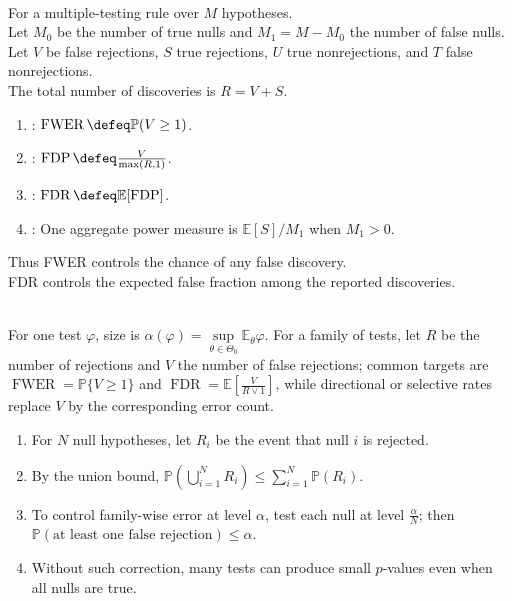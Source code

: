 \begin{definition} \label{def:false-discovery-rate} \\
For a multiple-testing rule over $M$ hypotheses.\\
Let $M_0$ be the number of true nulls and $M_1=M-M_0$ the number of false nulls.\\
Let $V$ be false rejections, $S$ true rejections, $U$ true nonrejections, and $T$ false nonrejections.\\
The total number of discoveries is $R=V+S$.
\begin{enumerate}[label=(\roman*)]
\setlength{\itemsep}{0pt}
\item {}: $\operatorname{FWER}\defeq\mathbb{P}(V\geq1)$.
\item {}: $\operatorname{FDP}\defeq\frac{V}{\max(R,1)}$.
\item {}: $\operatorname{FDR}\defeq\mathbb{E}[\operatorname{FDP}]$.
\item {}: One aggregate power measure is $\mathbb{E}[S]/M_1$ when $M_1>0$.
\end{enumerate}
Thus FWER controls the chance of any false discovery.\\
FDR controls the expected false fraction among the reported discoveries.
\end{definition}

\begin{remark} \label{rem:error-control-families} \\
For one test $\varphi$, size is $\alpha(\varphi)=\sup\limits_{\theta\in\Theta_0}\mathbb{E}_\theta\varphi$.
For a family of tests, let $R$ be the number of rejections and $V$ the number of false rejections; common targets are $\operatorname{FWER}=\mathbb{P}\{V\geq1\}$ and $\operatorname{FDR}=\mathbb{E}[\frac{V}{R\vee1}]$, while directional or selective rates replace $V$ by the corresponding error count.
\end{remark}

\begin{method} \label{prin:fishing-expeditions-and-bonferroni} 
\begin{enumerate}[label=(\roman*)]
\setlength{\itemsep}{0pt}
\item For $N$ null hypotheses, let $R_i$ be the event that null $i$ is rejected.
\item By the union bound, $\mathbb{P}(\bigcup\limits_{i=1}^{N}R_i)\leq\sum\limits_{i=1}^{N}\mathbb{P}(R_i)$.
\item To control family-wise error at level $\alpha$, test each null at level $\frac{\alpha}{N}$; then $\mathbb{P}(\text{at least one false rejection})\leq\alpha$.
\item Without such correction, many tests can produce small $p$-values even when all nulls are true.
\end{enumerate}
\end{method}


